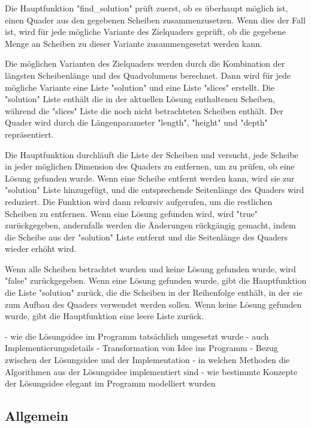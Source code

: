 \documentclass[a4paper,10pt,ngerman]{scrartcl}
\begin{document}
    Die Hauptfunktion "find_solution" prüft zuerst, ob es überhaupt möglich ist, einen Quader aus den gegebenen Scheiben zusammenzusetzen.
    Wenn dies der Fall ist, wird für jede mögliche Variante des Zielquaders geprüft, ob die gegebene Menge an Scheiben zu dieser Variante zusammengesetzt werden kann.

    Die möglichen Varianten des Zielquaders werden durch die Kombination der längsten Scheibenlänge und des Quadvolumens berechnet.
    Dann wird für jede mögliche Variante eine Liste "solution" und eine Liste "slices" erstellt.
    Die "solution" Liste enthält die in der aktuellen Lösung enthaltenen Scheiben, während die "slices" Liste die noch nicht betrachteten Scheiben enthält.
    Der Quader wird durch die Längenparameter "length", "height" und "depth" repräsentiert.

    Die Hauptfunktion durchläuft die Liste der Scheiben und versucht, jede Scheibe in jeder möglichen Dimension des Quaders zu entfernen, um zu prüfen, ob eine Lösung gefunden wurde.
    Wenn eine Scheibe entfernt werden kann, wird sie zur "solution" Liste hinzugefügt, und die entsprechende Seitenlänge des Quaders wird reduziert.
    Die Funktion wird dann rekursiv aufgerufen, um die restlichen Scheiben zu entfernen.
    Wenn eine Lösung gefunden wird, wird "true" zurückgegeben, andernfalls werden die Änderungen rückgängig gemacht,
    indem die Scheibe aus der "solution" Liste entfernt und die Seitenlänge des Quaders wieder erhöht wird.

    Wenn alle Scheiben betrachtet wurden und keine Lösung gefunden wurde, wird "false" zurückgegeben.
    Wenn eine Lösung gefunden wurde, gibt die Hauptfunktion die Liste "solution" zurück, die die Scheiben in der Reihenfolge enthält, in der sie zum Aufbau des Quaders verwendet werden sollen.
    Wenn keine Lösung gefunden wurde, gibt die Hauptfunktion eine leere Liste zurück.


    - wie die Lösungsidee im Programm tatsächlich umgesetzt wurde
    - auch Implementierungsdetails
    - Transformation von Idee ins Programm
    - Bezug zwischen der Lösungsidee und der Implementation
    - in welchen Methoden die Algorithmen aus der Lösungsidee implementiert sind
    - wie bestimmte Konzepte der Lösungsidee elegant im Programm modelliert wurden

    \subsection{Allgemein}\label{subsec:allgemein2}
\end{document}
